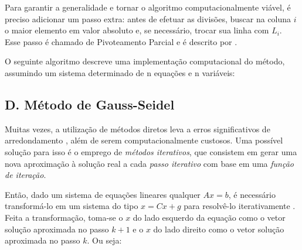 \documentclass[twocolumn, 10pt,a4paper]{extarticle}
\begin{document}
Para garantir a generalidade e tornar o algoritmo computacionalmente viável, é preciso adicionar um passo extra: antes de efetuar as divisões, buscar na coluna $i$ o maior elemento em valor absoluto e, se necessário, trocar sua linha com $L_i$. Esse passo é chamado de Pivoteamento Parcial e é descrito por \cite[p. 127]{ruggiero}.

O seguinte algoritmo descreve uma implementação computacional do método, assumindo um sistema determinado de n equações e n variáveis:

\begingroup
{}\label{gj}
\begin{algorithmic}[1]
  		\EndIf
	\EndFor
	\EndIf
\EndFunction
{}
		\EndFor
			\EndIf		
			\EndFor	
		\EndFor
	\EndFor
\EndFunction
\end{algorithmic}
\hrulefill
\endgroup

\subsection*{D. \quad Método de Gauss-Seidel}

Muitas vezes, a utilização de métodos diretos leva a erros significativos de arredondamento \cite[p. 173]{augusto}, além de serem computacionalmente custosos. Uma possível solução para isso é o emprego de \textit{métodos iterativos}, que consistem em gerar uma nova aproximação à solução real a cada \textit{passo iterativo} com base em uma \textit{função de iteração}.

Então, dado um sistema de equações lineares qualquer $Ax = b$, é necessário transformá-lo em um sistema do tipo $x = Cx + g$ para resolvê-lo iterativamente \cite[p. 167]{ruggiero}. Feita a transformação, toma-se o $x$ do lado esquerdo da equação como o vetor solução aproximada no passo $k+1$ e o $x$ do lado direito como o vetor solução aproximada no passo $k$. Ou seja:
\end{document}
